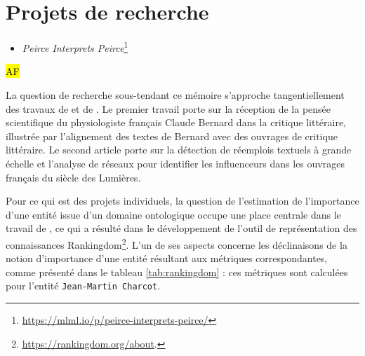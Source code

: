
\section{Projets de recherche}
\begin{itemize}
	\item \textit{Peirce Interprets Peirce}\footnote{\url{https://mlml.io/p/peirce-interprets-peirce/}}
\end{itemize}
\hl{AF}

La question de recherche sous-tendant ce mémoire s'approche tangentiellement des travaux de \citet{riguet2018impact} et de \citet{roe2023enlightenment}. Le premier travail porte sur la réception de la pensée scientifique du physiologiste français Claude Bernard dans la critique littéraire, illustrée par l'alignement des textes de Bernard avec des ouvrages de critique littéraire. Le second article porte sur la détection de réemplois textuels à grande échelle et l'analyse de réseaux pour identifier les \og{}influenceurs\fg{} dans les ouvrages français du siècle des Lumières.

Pour ce qui est des projets individuels, la question de l'estimation de l'importance d'une entité issue d'un domaine ontologique occupe une place centrale dans le travail de \citet{soulet2024}, ce qui a résulté dans le développement de l'outil de représentation des connaissances Rankingdom\footnote{\url{https://rankingdom.org/about}.}. L'un de ses aspects concerne les déclinaisons de la notion d'importance d'une entité résultant aux métriques correspondantes, comme présenté dans le tableau \ref{tab:rankingdom} : ces métriques sont calculées pour l'entité \texttt{Jean-Martin Charcot}.

